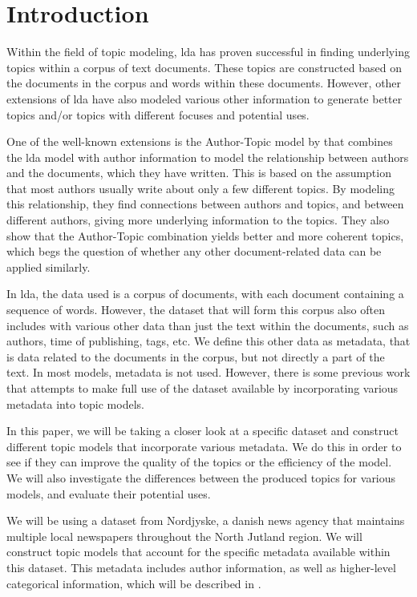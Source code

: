 \section{Introduction}\label{sec:introduction}
Within the field of topic modeling, \gls{lda} has proven successful in finding underlying topics within a corpus of text documents.
These topics are constructed based on the documents in the corpus and words within these documents. 
However, other extensions of \gls{lda} have also modeled various other information to generate better topics and/or topics with different focuses and potential uses.

One of the well-known extensions is the Author-Topic model by \citet{author_topic_2012} that combines the \gls{lda} model with author information to model the relationship between authors and the documents, which they have written.
This is based on the assumption that most authors usually write about only a few different topics.
By modeling this relationship, they find connections between authors and topics, and between different authors, giving more underlying information to the topics.
They also show that the Author-Topic combination yields better and more coherent topics, which begs the question of whether any other document-related data can be applied similarly.

In \gls{lda}, the data used is a corpus of documents, with each document containing a sequence of words.
However, the dataset that will form this corpus also often includes with various other data than just the text within the documents, such as authors, time of publishing, tags, etc.
We define this other data as metadata, that is data related to the documents in the corpus, but not directly a part of the text.
In most models, metadata is not used.
However, there is some previous work that attempts to make full use of the dataset available by incorporating various metadata into topic models.

In this paper, we will be taking a closer look at a specific dataset and construct different topic models that incorporate various metadata.
We do this in order to see if they can improve the quality of the topics or the efficiency of the model.
We will also investigate the differences between the produced topics for various models, and evaluate their potential uses.

We will be using a dataset from Nordjyske, a danish news agency that maintains multiple local newspapers throughout the North Jutland region.
We will construct topic models that account for the specific metadata available within this dataset.
This metadata includes author information, as well as higher-level categorical information, which will be described in .

